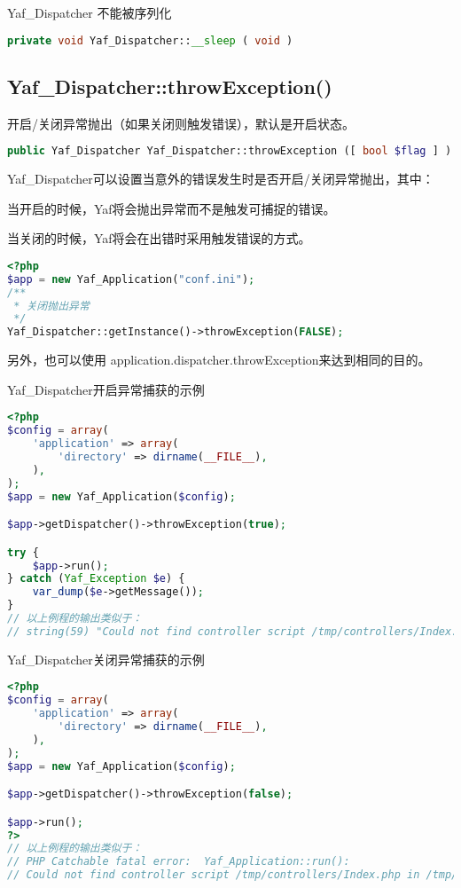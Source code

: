 Yaf\_Dispatcher 不能被序列化

\begin{lstlisting}[language=PHP]
private void Yaf_Dispatcher::__sleep ( void )
\end{lstlisting}

\subsection{Yaf\_Dispatcher::throwException()}

开启/关闭异常抛出（如果关闭则触发错误），默认是开启状态。

\begin{lstlisting}[language=PHP]
public Yaf_Dispatcher Yaf_Dispatcher::throwException ([ bool $flag ] )
\end{lstlisting}

Yaf\_Dispatcher可以设置当意外的错误发生时是否开启/关闭异常抛出，其中：

\begin{compactitem}
\item 当开启的时候，Yaf将会抛出异常而不是触发可捕捉的错误。
\item 当关闭的时候，Yaf将会在出错时采用触发错误的方式。
\end{compactitem}

\begin{lstlisting}[language=PHP]
<?php
$app = new Yaf_Application("conf.ini");
/**
 * 关闭抛出异常
 */
Yaf_Dispatcher::getInstance()->throwException(FALSE);
\end{lstlisting}

另外，也可以使用 application.dispatcher.throwException来达到相同的目的。

\begin{example}
Yaf\_Dispatcher开启异常捕获的示例
\begin{lstlisting}[language=PHP]
<?php
$config = array(
    'application' => array(
        'directory' => dirname(__FILE__),
    ),
);
$app = new Yaf_Application($config);

$app->getDispatcher()->throwException(true);

try {
    $app->run();
} catch (Yaf_Exception $e) {
    var_dump($e->getMessage());
}
// 以上例程的输出类似于：
// string(59) "Could not find controller script /tmp/controllers/Index.php"
\end{lstlisting}
\end{example}


\begin{example}
Yaf\_Dispatcher关闭异常捕获的示例
\begin{lstlisting}[language=PHP]
<?php
$config = array(
    'application' => array(
        'directory' => dirname(__FILE__),
    ),
);
$app = new Yaf_Application($config);

$app->getDispatcher()->throwException(false);

$app->run();
?>
// 以上例程的输出类似于：
// PHP Catchable fatal error:  Yaf_Application::run(): 
// Could not find controller script /tmp/controllers/Index.php in /tmp/1.php on line 12
\end{lstlisting}
\end{example}


